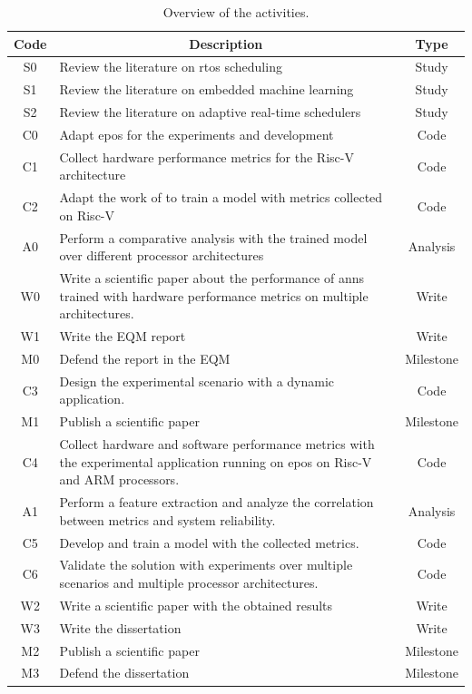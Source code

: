 \documentclass[journal,onecolumn]{IEEEtran}
\begin{document}
\begin{table}[ht]
\centering
\begin{tabular}{|c|p{8cm}|c|}
\hline
Code & \multicolumn{1}{c|}{Description} & Type \\ \hline
S0 & Review the literature on \gls{rtos} scheduling & Study \\ \hline
S1 & Review the literature on embedded machine learning & Study \\ \hline
S2 & Review the literature on adaptive real-time schedulers & Study \\ \hline
C0 & Adapt \gls{epos} for the experiments and development & Code \\ \hline
C1 & Collect hardware performance metrics for the Risc-V architecture & Code \\ \hline
C2 & Adapt the work of \citet{hoffmann2021online} to train a model with metrics collected on Risc-V & Code \\ \hline
A0 & Perform a comparative analysis with the trained model over different processor architectures & Analysis \\ \hline
W0 & Write a scientific paper about the performance of \glspl{ann} trained with hardware performance metrics on multiple architectures. & Write \\ \hline
W1 & Write the EQM report & Write \\ \hline
M0 & Defend the report in the EQM & Milestone \\ \hline
C3 & Design the experimental scenario with a dynamic application. & Code \\ \hline
M1 & Publish a scientific paper & Milestone \\ \hline
C4 & Collect hardware and software performance metrics with the experimental application running on \gls{epos} on Risc-V and ARM processors. & Code \\ \hline
A1 & Perform a feature extraction and analyze the correlation between metrics and system reliability. & Analysis \\ \hline
C5 & Develop and train a model with the collected metrics. & Code \\ \hline
C6 & Validate the solution with experiments over multiple scenarios and multiple processor architectures. & Code \\ \hline
W2 & Write a scientific paper with the obtained results & Write \\ \hline
W3 & Write the dissertation & Write \\ \hline
M2 & Publish a scientific paper & Milestone \\ \hline
M3 & Defend the dissertation & Milestone \\ \hline
\end{tabular}
\caption{Overview of the activities.}
\label{tab:activities}
\end{table}
\end{document}
